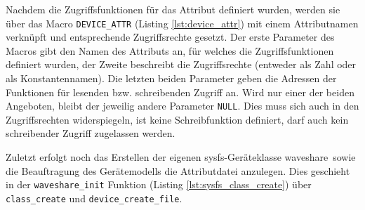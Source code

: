 Nachdem die Zugriffsfunktionen für das Attribut definiert wurden, werden sie über das Macro \texttt{DEVICE\_ATTR} (Listing \ref{lst:device_attr}) mit einem Attributnamen verknüpft und entsprechende Zugriffsrechte gesetzt. Der erste Parameter des Macros gibt den Namen des Attributs an, für welches die Zugriffsfunktionen definiert wurden, der Zweite beschreibt die Zugriffsrechte (entweder als Zahl oder als Konstantennamen). Die letzten beiden Parameter geben die Adressen der Funktionen für lesenden bzw. schreibenden Zugriff an. Wird nur einer der beiden Angeboten, bleibt der jeweilig andere Parameter \texttt{NULL}. Dies muss sich auch in den Zugriffsrechten widerspiegeln, ist keine Schreibfunktion definiert, darf auch kein schreibender Zugriff zugelassen werden. 




Zuletzt erfolgt noch das Erstellen der eigenen sysfs-Geräteklasse \glqq waveshare\grqq~sowie die Beauftragung des Gerätemodells die Attributdatei anzulegen. Dies geschieht in der \texttt{waveshare_init} Funktion (Listing  \ref{lst:sysfs_class_create}) über \texttt{class\_create} und \texttt{device\_create\_file}.


